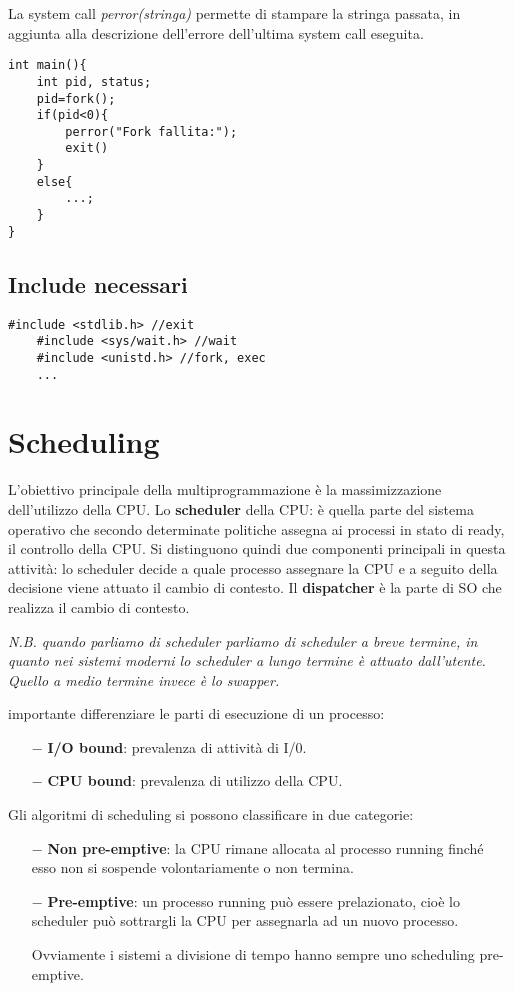 \documentclass{article}
\begin{document}
\noindent La system call \textit{perror(stringa)} permette di
 stampare la stringa passata, in aggiunta alla descrizione 
 dell'errore dell'ultima system call eseguita.

\begin{lstlisting}[style=CStyle]
int main(){
    int pid, status;
    pid=fork();
    if(pid<0){
        perror("Fork fallita:");
        exit()
    }
    else{
        ...;
    }
}
\end{lstlisting}

\subsection{Include necessari}
\begin{lstlisting}[style=CStyle]
    #include <stdlib.h> //exit
    #include <sys/wait.h> //wait
    #include <unistd.h> //fork, exec
    ...
\end{lstlisting}

\section{Scheduling}
L'obiettivo principale della multiprogrammazione è la massimizzazione 
dell'utilizzo della CPU.
Lo \textbf{scheduler} della CPU: è quella parte del sistema operativo 
che secondo determinate politiche assegna ai processi in stato 
di ready, il controllo della CPU.
Si distinguono quindi due componenti principali in questa 
attività: lo scheduler decide a quale processo assegnare
la CPU e a seguito della decisione viene attuato il cambio di
contesto. Il \textbf{dispatcher} è la parte di SO che
realizza il cambio di contesto.
\medskip

\noindent \textit{N.B. quando parliamo di scheduler parliamo
 di scheduler a breve termine, in quanto nei sistemi moderni
 lo scheduler a lungo termine è attuato dall'utente. Quello
 a medio termine invece è lo swapper.
}
\medskip

 importante differenziare le parti di esecuzione
 di un processo:\begin{itemize}
    \item[$-$] \textbf{I/O bound}: prevalenza di attività di I/0.
    \item[$-$] \textbf{CPU bound}: prevalenza di utilizzo della CPU.
  \end{itemize}
\noindent Gli algoritmi di scheduling si possono 
classificare in due categorie:
\begin{itemize}
    \item[$-$] \textbf{Non pre-emptive}: la CPU rimane allocata al
    processo running finché esso non si sospende volontariamente
    o non termina.
    \item[$-$] \textbf{Pre-emptive}: un processo running può essere
    prelazionato, cioè lo scheduler può sottrargli la CPU per 
    assegnarla ad un nuovo processo.

    Ovviamente i sistemi a divisione di tempo hanno sempre 
    uno scheduling pre-emptive.
 \end{itemize}
\end{document}

